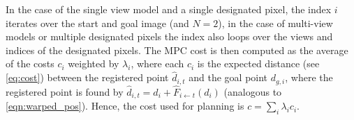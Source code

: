 In the case of the single view model and a single designated pixel, the index $i$ iterates over the start and goal image (and $N=2$), in the case of multi-view models or multiple designated pixels the index also loops over the views and indices of the designated pixels. 
The MPC cost is then computed as the average of the costs $c_i$ weighted by $\lambda_i$, where each $c_i$ is the expected distance (see \autoref{eq:cost}) between the registered point $\hat{d}_{i,t}$ and the goal point $d_{g,i}$, where the registered point is found by $\hat{d}_{i,t} = d_i + \hat{F}_{i \leftarrow t}(d_i)$ (analogous to \autoref{eqn:warped_pos}). Hence, the cost used for planning is $c = \sum_i \lambda_i c_i$.
